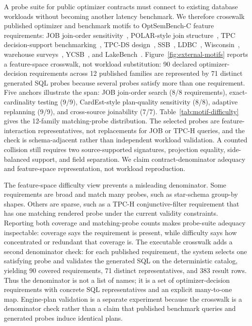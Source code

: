 A probe suite for public optimizer contracts must connect to existing database workloads without becoming another latency benchmark.  We therefore crosswalk published optimizer and benchmark motifs to OptSemBench-C feature requirements: JOB join-order sensitivity~\cite{leis2015good}, POLAR-style join structure~\cite{justen2024polar}, TPC decision-support benchmarking~\cite{poess2000tpc}, TPC-DS design~\cite{nambiar2006tpcds}, SSB~\cite{oneil2009ssb}, LDBC~\cite{erling2015ldbc}, Wisconsin~\cite{bitton1983wisconsin}, warehouse surveys~\cite{darmont2007benchmarking}, YCSB~\cite{cooper2010ycsb}, and LakeBench~\cite{deng2024lakebench}.  Figure~\ref{fig:external-motifs} reports a feature-space crosswalk, not workload substitution: 90 declared optimizer-decision requirements across 12 published families are represented by 71 distinct generated SQL probes because several probes satisfy more than one requirement.  Five anchors illustrate the span: JOB join-order search (8/8 requirements), exact-cardinality testing (9/9), CardEst-style plan-quality sensitivity (8/8), adaptive replanning (9/9), and cross-source joinability (7/7).  Table~\ref{tab:motif-difficulty} gives the 12-family matching-probe distribution.  The selected probes are feature-interaction representatives, not replacements for JOB or TPC-H queries, and the check is schema-adjacent rather than independent workload validation.  A counted collision still requires two source-supported signatures, projection equality, side-balanced support, and field separation.  We claim contract-denominator adequacy and feature-space representation, not workload reproduction.




The feature-space difficulty view prevents a misleading denominator.  Some requirements are broad and match many probes, such as star-schema group-by shapes.  Others are sparse, such as a TPC-H conjunctive-filter requirement that has one matching rendered probe under the current validity constraints.  Reporting both coverage and matching-probe counts makes probe-suite adequacy inspectable: coverage says the requirement is present, while difficulty says how concentrated or redundant that coverage is.  The executable crosswalk adds a second denominator check: for each published requirement, the system selects one satisfying probe and validates the generated SQL on the deterministic catalog, yielding 90 covered requirements, 71 distinct representatives, and 383 result rows.  Thus the denominator is not a list of names; it is a set of optimizer-decision requirements with concrete SQL representatives and an explicit many-to-one map.  Engine-plan validation is a separate experiment because the crosswalk is a denominator check rather than a claim that published benchmark queries and generated probes induce identical plans.
